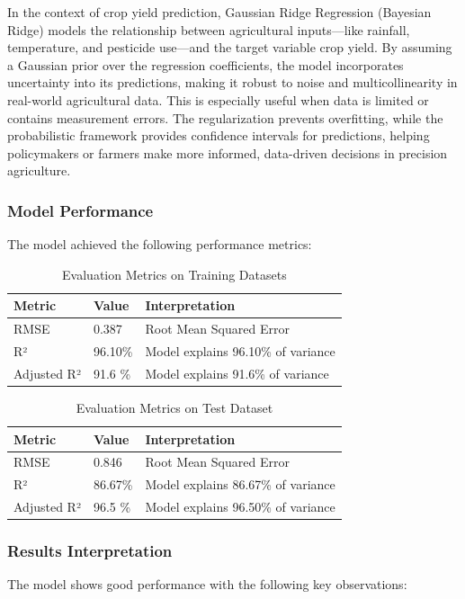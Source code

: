 In the context of crop yield prediction, Gaussian Ridge Regression (Bayesian Ridge) models the relationship between agricultural inputs—like rainfall, temperature, and pesticide use—and the target variable crop yield. By assuming a Gaussian prior over the regression coefficients, the model incorporates uncertainty into its predictions, making it robust to noise and multicollinearity in real-world agricultural data. This is especially useful when data is limited or contains measurement errors. The regularization prevents overfitting, while the probabilistic framework provides confidence intervals for predictions, helping policymakers or farmers make more informed, data-driven decisions in precision agriculture.

\subsubsection{Model Performance}
The model achieved the following performance metrics:

\begin{table}[h]
\centering
\caption{Evaluation Metrics on Training Datasets}
\begin{tabular}{lll}
\toprule
\textbf{Metric} & \textbf{Value} & \textbf{Interpretation} \\
\midrule
RMSE & 0.387 & Root Mean Squared Error \\
R² & 96.10\% & Model explains 96.10\% of variance\\
Adjusted R² & 91.6 \%  & Model explains 91.6\% of variance\\
\bottomrule
\end{tabular}
\end{table}

\begin{table}[h]
\centering
\caption{Evaluation Metrics on Test Dataset}
\begin{tabular}{lll}
\toprule
\textbf{Metric} & \textbf{Value} & \textbf{Interpretation} \\
\midrule
RMSE & 0.846 & Root Mean Squared Error \\
R² & 86.67\% & Model explains 86.67\% of variance\\
Adjusted R² & 96.5 \%  & Model explains 96.50\% of variance\\
\bottomrule
\end{tabular}
\end{table}

\subsubsection{Results Interpretation}
The model shows good performance with the following key observations:

